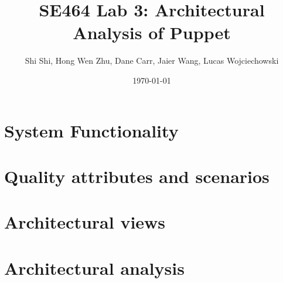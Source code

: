 \documentclass[a4paper]{article}
\title{SE464 Lab 3: Architectural Analysis of Puppet}
\author{Shi Shi, Hong Wen Zhu, Dane Carr, Jaier Wang, Lucas Wojciechowski}
\date{\today}
\begin{document}
\maketitle

\section{System  Functionality} %


\section{Quality attributes  and scenarios} %


\section{Architectural views} %



\section{Architectural analysis} %

\end{document}

